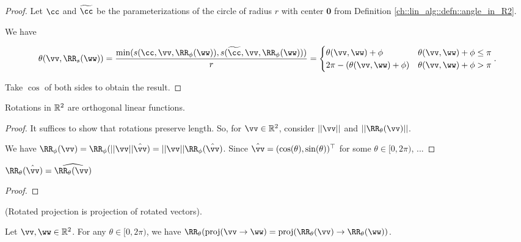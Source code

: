\begin{proof}
    Let $\cc$ and $\widetilde{\cc}$ be the parameterizations of the circle of radius $r$ with center $\mathbf{0}$ from Definition \ref{ch::lin_alg::defn::angle_in_R2}.
    
    We have

    \begin{align*}
        \theta(\vv, \RR_s(\ww)) =
        \frac{\min(s(\cc, \vv, \RR_\phi(\ww)), s(\widetilde{\cc}, \vv, \RR_\phi(\ww)))}{r}
        =
        \begin{cases}
            \theta(\vv, \ww) + \phi & \theta(\vv, \ww) + \phi \leq \pi \\
            2\pi - (\theta(\vv, \ww) + \phi) & \theta(\vv, \ww) + \phi > \pi
        \end{cases}.
    \end{align*}

    Take $\cos$ of both sides to obtain the result.
\end{proof}

\begin{theorem}
    Rotations in $\mathbb{R}^2$ are orthogonal linear functions.
\end{theorem}

\begin{proof}
    It suffices to show that rotations preserve length. So, for $\vv \in \R^2$, consider $||\vv||$ and $||\RR_\theta(\vv)||$. 
    
    We have $\RR_\phi(\vv) = \RR_\phi(||\vv|| \hvv) = ||\vv|| \RR_\phi(\hvv)$. Since ${\hvv = (\cos(\theta), \sin(\theta))^\top}$ for some $\theta \in [0, 2\pi)$, ...
\end{proof}

\begin{theorem}
    $\RR_\theta(\hvv) = \widehat{\RR_\theta(\vv)}$
\end{theorem}

\begin{proof}
    
\end{proof}

\begin{lemma}
    \label{ch::lin_alg::lemma::rotated_projection}
    (Rotated projection is projection of rotated vectors). 
    
    Let $\vv, \ww \in \R^2$. For any $\theta \in [0, 2\pi)$, we have $\RR_\theta(\proj(\vv \rightarrow \ww) = \proj(\RR_\theta(\vv) \rightarrow \RR_\theta(\ww))$.
\end{lemma}


